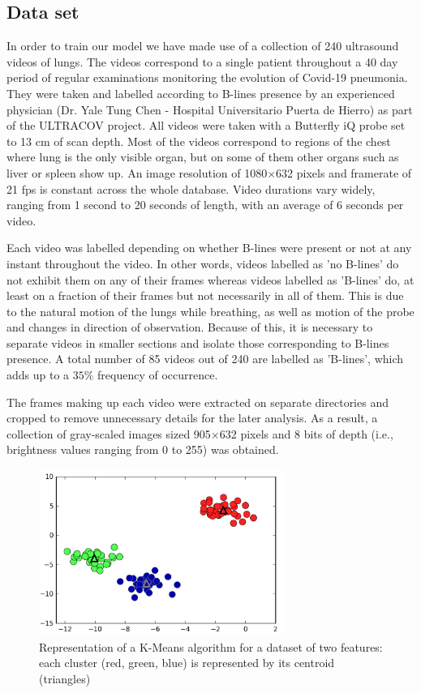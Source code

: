 \documentclass[11pt]{article} %
\begin{document}
\subsection{Data set}

	In order to train our model we have made use of a collection of 240 ultrasound videos of lungs. The videos correspond to a single patient throughout a 40 day period of regular examinations monitoring the evolution of Covid-19 pneumonia. They were taken and labelled according to B-lines presence by an experienced physician (Dr. Yale Tung Chen \cite{tung2020lung}
	 - Hospital Universitario Puerta de Hierro) as part of the ULTRACOV project. All videos were taken with a Butterfly iQ probe set to 13 cm of scan depth. Most of the videos correspond to regions of the chest where lung is the only visible organ, but on some of them other organs such as liver or spleen show up. An image resolution of 1080$\times$632 pixels and framerate of 21 fps is constant across the whole database. Video durations vary widely, ranging from 1 second to 20 seconds of length, with an average of 6 seconds per video. 
	
	Each video was labelled depending on whether B-lines were present or not at any instant throughout the video. In other words, videos labelled as 'no B-lines' do not exhibit them on any of their frames whereas videos labelled as 'B-lines' do, at least on a fraction of their frames but not necessarily in all of them. This is due to the natural motion of the lungs while breathing, as well as motion of the probe and changes in direction of observation. Because of this, it is necessary to  separate videos in smaller sections and isolate those corresponding to B-lines presence. A total number of 85 videos out of 240 are labelled as 'B-lines', which adds up to a $35 \%$ frequency of occurrence. 
	
	The frames making up each video were extracted on separate directories and cropped to remove unnecessary details for the later analysis. As a result, a collection of gray-scaled images sized 905$\times$632 pixels and 8 bits of depth (i.e., brightness values ranging from 0 to 255) was obtained. 
	
	\begin{figure}
	\centering
	\includegraphics[width=8cm]{figuras/clusters.png}
	\caption{Representation of a K-Means algorithm for a dataset of two features: each cluster (red, green, blue) is represented by its centroid (triangles)\cite{python}}
	\end{figure}
	
\end{document}
